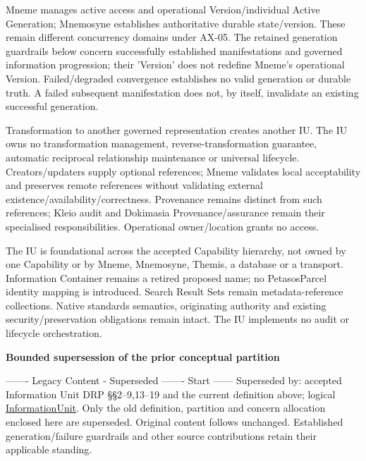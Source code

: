 Mneme manages active access and operational Version/individual Active Generation;
Mnemosyne establishes authoritative durable state/version. These remain different
concurrency domains under AX-05. The retained generation guardrails below concern
successfully established manifestations and governed information progression;
their 'Version' does not redefine Mneme's operational Version. Failed/degraded
convergence establishes no valid generation or durable truth. A failed subsequent
manifestation does not, by itself, invalidate an existing successful generation.



Transformation to another governed representation creates another IU. The IU owns
no transformation management, reverse-transformation guarantee, automatic reciprocal
relationship maintenance or universal lifecycle. Creators/updaters supply optional
references; Mneme validates local acceptability and preserves remote references
without validating external existence/availability/correctness. Provenance remains
distinct from such references; Kleio audit and Dokimasia Provenance/assurance remain
their specialised responsibilities. Operational owner/location grants no access.



The IU is foundational across the accepted Capability hierarchy, not owned by one
Capability or by Mneme, Mnemosyne, Themis, a database or a transport. Information
Container remains a retired proposed name; no PetasosParcel identity mapping is
introduced. Search Result Sets remain metadata-reference collections. Native
standards semantics, originating authority and existing security/preservation
obligations remain intact. The IU implements no audit or lifecycle orchestration.



\par\medskip\textbf{Bounded supersession of the prior conceptual partition}\par


------- Legacy Content - Superseded ------- Start ------
Superseded by: accepted Information Unit DRP §§2–9,13–19 and the current definition
above; logical \hyperref[element:74ec609de1ae498fbf9d13e4ef8c6cbe]{InformationUnit}.
Only the old definition, partition and concern allocation enclosed here are
superseded. Original content follows unchanged. Established generation/failure
guardrails and other source contributions retain their applicable standing.



